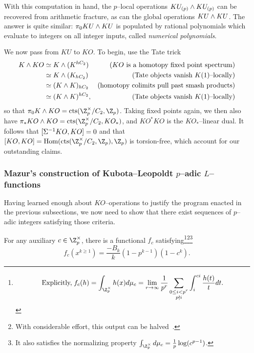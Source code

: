 \begin{remark}
With this computation in hand, the $p$--local operations $KU_{(p)} \wedge KU_{(p)}$ can be recovered from arithmetic fracture, as can the global operations $KU \wedge KU$.  The answer is quite similar: $\pi_0 KU \wedge KU$ is populated by rational polynomials which evaluate to integers on all integer inputs, called \textit{numerical polynomials}.
\end{remark}

We now pass from $KU$ to $KO$.  To begin, use the Tate trick
\begin{align*}
K \wedge KO & \simeq K \wedge (K^{hC_2}) & \text{($KO$ is a homotopy fixed point spectrum)} \\
& \simeq K \wedge (K_{hC_2}) & \text{(Tate objects vanish $K(1)$--locally)} \\
& \simeq (K \wedge K)_{hC_2} & \text{(homotopy colimits pull past smash products)} \\
& \simeq (K \wedge K)^{hC_2}, & \text{(Tate objects vanish $K(1)$--locally)}
\end{align*}
so that $\pi_0 K \sm KO = \cts(\Z_p^\times / C_2, \Z_p)$.  Taking fixed points again, we then also have $\pi_* KO \sm KO = \cts(\Z_p^\times / C_2, KO_*)$, and $KO^* KO$ is the $KO_*$--linear dual.  It follows that $[\Sigma^{-1} KO, KO] = 0$ and that $[KO, KO] = \Hom(\cts(\Z_p^\times / C_2, \Z_p), \Z_p)$ is torsion-free, which account for our outstanding claims.


\subsubsection{Mazur's construction of Kubota--Leopoldt $p$--adic $L$--functions}

Having learned enough about $KO$--operations to justify the program enacted in the previous subsections, we now need to show that there exist sequences of $p$--adic integers satisfying those criteria.

\begin{theorem}[Mazur]
For any auxiliary $c \in \Z_p^\times$, there is a functional $f_c$ satisfying\footnote{\[\text{Explicitly,\;} f_c(h) = \int_{\Z_p^\times} h(x) d\mu_c = \lim_{r \to \infty} \frac{1}{p^r} \sum_{\substack{0 \le i < p^r \\ p \nmid i}} \int_i^{ci} \frac{h(t)}{t} dt.\]}\footnote{With considerable effort, this output can be halved~\cite[Section 10.3]{AHR}.}\footnote{It also satisfies the normalizing property $\int_{\Z_p^\times} d\mu_c = \frac{1}{p} \log(c^{p-1})$.} \[f_c(x^{k \ge 1}) = \frac{-B_k}{k}(1 - p^{k-1})(1 - c^k).\]
\end{theorem}

